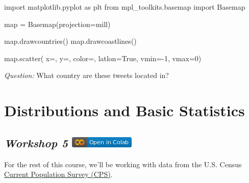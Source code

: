 \documentclass[
  letterpaper,
  DIV=11,
  numbers=noendperiod]{scrreprt}
\newenvironment{Shaded}{\begin{snugshade}}{\end{snugshade}}
\newcommand{\BuiltInTok}[1]{\textcolor[rgb]{0.00,0.23,0.31}{#1}}
\newcommand{\DecValTok}[1]{\textcolor[rgb]{0.68,0.00,0.00}{#1}}
\newcommand{\ImportTok}[1]{\textcolor[rgb]{0.00,0.46,0.62}{#1}}
\newcommand{\NormalTok}[1]{\textcolor[rgb]{0.00,0.23,0.31}{#1}}
\newcommand{\OperatorTok}[1]{\textcolor[rgb]{0.37,0.37,0.37}{#1}}
\newcommand{\StringTok}[1]{\textcolor[rgb]{0.13,0.47,0.30}{#1}}
\newcommand{\VariableTok}[1]{\textcolor[rgb]{0.07,0.07,0.07}{#1}}
\begin{document}
\begin{Shaded}
\begin{Highlighting}[]
\ImportTok{import}\NormalTok{ matplotlib.pyplot }\ImportTok{as}\NormalTok{ plt}
\ImportTok{from}\NormalTok{ mpl\_toolkits.basemap }\ImportTok{import}\NormalTok{ Basemap}

\BuiltInTok{map} \OperatorTok{=}\NormalTok{ Basemap(projection}\OperatorTok{=}\StringTok{\textquotesingle{}mill\textquotesingle{}}\NormalTok{)}

\BuiltInTok{map}\NormalTok{.drawcountries()}
\BuiltInTok{map}\NormalTok{.drawcoastlines()}

\BuiltInTok{map}\NormalTok{.scatter(}
\NormalTok{      x}\OperatorTok{=}\NormalTok{, }
\NormalTok{      y}\OperatorTok{=}\NormalTok{, }
\NormalTok{      color}\OperatorTok{=}\NormalTok{,}
\NormalTok{      latlon}\OperatorTok{=}\VariableTok{True}\NormalTok{, }
\NormalTok{      vmin}\OperatorTok{={-}}\DecValTok{1}\NormalTok{, }
\NormalTok{      vmax}\OperatorTok{=}\DecValTok{0}\NormalTok{)}
\end{Highlighting}
\end{Shaded}

\emph{Question:} What country are these tweets located in?


\hypertarget{distributions-and-basic-statistics}{%
\chapter{Distributions and Basic
Statistics}\label{distributions-and-basic-statistics}}

\hypertarget{workshop-5-open-in-colab}{%
\section[\emph{Workshop 5} ]{\texorpdfstring{\emph{Workshop 5}
\href{https://colab.research.google.com/github/oballinger/QM2/blob/main/notebooks/W05.\%20Distributions\%20and\%20Basic\%20Statistics.ipynb}{\protect\includegraphics{index_files/mediabag/colab-badge.png}}}{Workshop 5 Open In Colab}}\label{workshop-5-open-in-colab}}

For the rest of this course, we'll be working with data from the U.S.
Census \href{https://www.census.gov/programs-surveys/cps.html}{Current
Population Survey (CPS)}.
\end{document}
